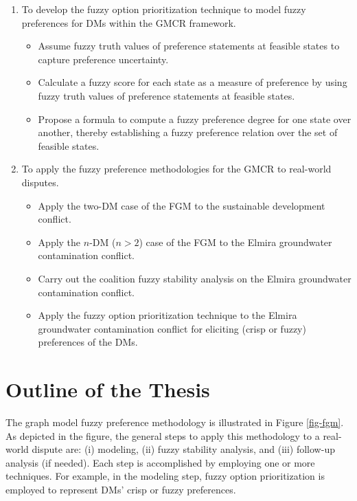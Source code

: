 \begin{enumerate}
  \item To develop the fuzzy option prioritization technique to model fuzzy preferences for DMs within the GMCR framework.
    \begin{itemize}
      \item Assume fuzzy truth values of preference statements at feasible states to capture preference uncertainty.
      \item Calculate a fuzzy score for each state as a measure of preference by using fuzzy truth values of preference statements at feasible states.
      \item Propose a formula to compute a fuzzy preference degree for one state over another, thereby establishing a fuzzy preference relation over the set of feasible states.
    \end{itemize}

  \item To apply the fuzzy preference methodologies for the GMCR to real-world disputes.
    \begin{itemize}
      \item Apply the two-DM case of the FGM to the sustainable development conflict.
      \item Apply the $n$-DM ($n>2$) case of the FGM to the Elmira groundwater contamination conflict.
      \item Carry out the coalition fuzzy stability analysis on the Elmira groundwater contamination conflict.
      \item Apply the fuzzy option prioritization technique to the Elmira groundwater contamination conflict for eliciting (crisp or fuzzy) preferences of the DMs.
    \end{itemize}

\end{enumerate}

\section{Outline of the Thesis}

The graph model fuzzy preference methodology is illustrated in Figure \ref{fig-fgm}. As depicted in the figure, the general steps to apply this methodology to a real-world dispute are: (i) modeling, (ii) fuzzy stability analysis, and (iii) follow-up analysis (if needed). Each step is accomplished by employing one or more techniques. For example, in the modeling step, fuzzy option prioritization is employed to represent DMs’ crisp or fuzzy preferences.

